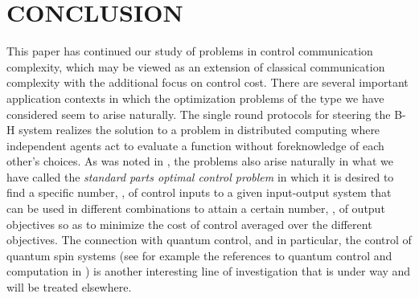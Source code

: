 \documentclass[12pt,onecolumn,draftcls]{IEEEtran}
\begin{document}
\section{CONCLUSION}\setcounter{equation}{0}

This paper has continued our study of problems in control communication complexity, which may be viewed as an extension of classical communication complexity with the additional focus on control cost.  There are several important application contexts in which the optimization problems of the type we have considered seem to arise naturally.  The single round protocols for steering the B-H system realizes the solution to a problem in distributed computing where independent agents act to evaluate a function without foreknowledge of each other's choices.  As was noted in \cite{CDC09}, the problems also arise naturally in what we have called the {\em standard parts optimal control problem} in which it is desired to find a specific number, , of control inputs to a given input-output system that can be used in different combinations to attain a certain number, , of output objectives so as to minimize the cost of control averaged over the different objectives. 
The connection with quantum control, and in particular, the control of quantum spin systems (see for example the references to quantum control and computation in \cite{WB}) is another interesting line of investigation that is under way and will be treated elsewhere.
\end{document}

